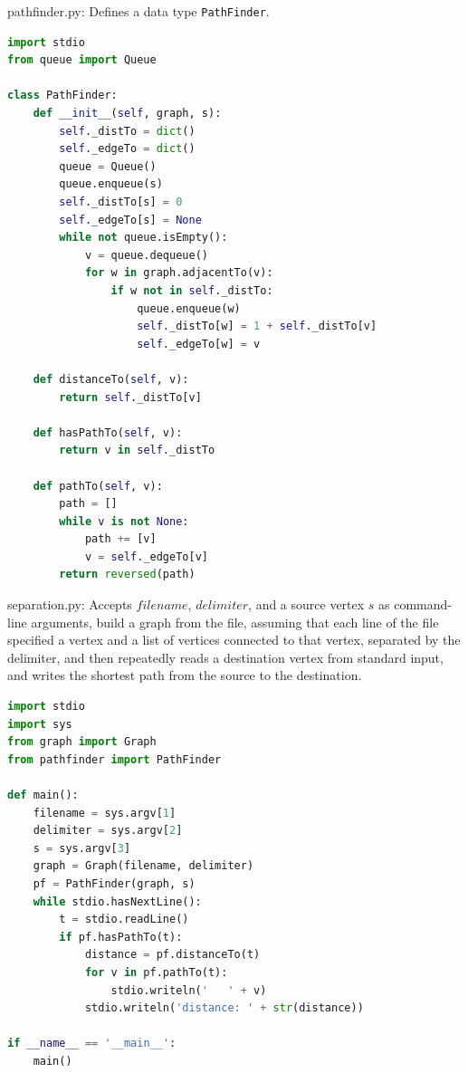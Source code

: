 \documentclass[8pt,a4paper,compress,handout]{beamer}
\begin{document}
\begin{frame}[fragile]
\begin{framed}
\tiny pathfinder.py: Defines a data type \lstinline{PathFinder}.
\end{framed}

\begin{lstlisting}[language=Python]
import stdio
from queue import Queue

class PathFinder:
    def __init__(self, graph, s):
        self._distTo = dict()
        self._edgeTo = dict()
        queue = Queue()
        queue.enqueue(s)
        self._distTo[s] = 0
        self._edgeTo[s] = None
        while not queue.isEmpty():
            v = queue.dequeue()
            for w in graph.adjacentTo(v):
                if w not in self._distTo:
                    queue.enqueue(w)
                    self._distTo[w] = 1 + self._distTo[v]
                    self._edgeTo[w] = v
    
    def distanceTo(self, v):
        return self._distTo[v]
        
    def hasPathTo(self, v):
        return v in self._distTo

    def pathTo(self, v):
        path = []
        while v is not None:
            path += [v]
            v = self._edgeTo[v]
        return reversed(path)
\end{lstlisting}
\end{frame}

\begin{frame}[fragile]
\begin{framed}
\tiny separation.py: Accepts $filename$, $delimiter$, and a source vertex $s$ as command-line arguments, build a graph from the file, assuming that each line of the file specified a vertex and a list of vertices connected to that vertex, separated by the delimiter, and then repeatedly reads a destination vertex from standard input, and writes the shortest path from the source to the destination.
\end{framed}

\begin{lstlisting}[language=Python]
import stdio
import sys
from graph import Graph
from pathfinder import PathFinder

def main():
    filename = sys.argv[1]
    delimiter = sys.argv[2]
    s = sys.argv[3]
    graph = Graph(filename, delimiter)
    pf = PathFinder(graph, s)
    while stdio.hasNextLine():
        t = stdio.readLine()
        if pf.hasPathTo(t):
            distance = pf.distanceTo(t)
            for v in pf.pathTo(t):
                stdio.writeln('   ' + v)
            stdio.writeln('distance: ' + str(distance))

if __name__ == '__main__':
    main()
\end{lstlisting}
\end{frame}
\end{document}

